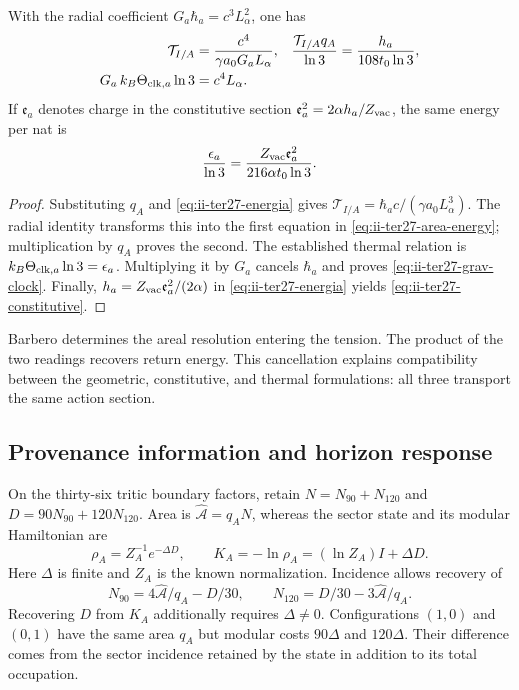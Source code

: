 \begin{proposition}
\label{prop:ii-ter27-area}
With the radial coefficient $G_a\hbar_a=c^3L_\alpha^2$, one has
\begin{align}
 \mathcal T_{I/A}&=\frac{c^4}{\gamma a_0G_aL_\alpha},&
 \frac{\mathcal T_{I/A}q_A}{\ln3}
 &=\frac{h_a}{108t_0\ln3},\label{eq:ii-ter27-area-energy}\\
 G_a\,k_B\Theta_{{\rm clk},a}\ln3&=c^4L_\alpha.&
 \label{eq:ii-ter27-grav-clock}
\end{align}
If $\mathfrak e_a$ denotes charge in the constitutive section
$\mathfrak e_a^2=2\alpha h_a/Z_{\rm vac}$, the same energy per nat is
\begin{equation}
 \frac{\epsilon_a}{\ln3}
 =\frac{Z_{\rm vac}\mathfrak e_a^2}{216\alpha t_0\ln3}.
 \label{eq:ii-ter27-constitutive}
\end{equation}
\end{proposition}
\begin{proof}
Substituting $q_A$ and \eqref{eq:ii-ter27-energia} gives
$\mathcal T_{I/A}=\hbar_ac/(\gamma a_0L_\alpha^3)$.
The radial identity transforms this into the first equation in
\eqref{eq:ii-ter27-area-energy}; multiplication by $q_A$ proves the second.
The established thermal relation is
$k_B\Theta_{{\rm clk},a}\ln3=\epsilon_a$.
Multiplying it by $G_a$ cancels $\hbar_a$ and proves
\eqref{eq:ii-ter27-grav-clock}. Finally,
$h_a=Z_{\rm vac}\mathfrak e_a^2/(2\alpha)$ in
\eqref{eq:ii-ter27-energia} yields \eqref{eq:ii-ter27-constitutive}.
\end{proof}

Barbero determines the areal resolution entering the tension. The product
of the two readings recovers return energy. This cancellation explains
compatibility between the geometric, constitutive, and thermal formulations:
all three transport the same action section.

\subsection{Provenance information and horizon response}
\label{subsec:ii-termica-horizonte}

On the thirty-six tritic boundary factors, retain
$N=N_{90}+N_{120}$ and $D=90N_{90}+120N_{120}$. Area is
$\widehat{\mathcal A}=q_AN$, whereas the sector state and its modular
Hamiltonian are
\begin{equation}
 \rho_A=Z_A^{-1}e^{-\Delta D},\qquad
 K_A=-\ln\rho_A=(\ln Z_A)I+\Delta D.
 \label{eq:ii-ter27-modular}
\end{equation}
Here $\Delta$ is finite and $Z_A$ is the known normalization. Incidence
allows recovery of
\[
 N_{90}=4\widehat{\mathcal A}/q_A-D/30,\qquad
 N_{120}=D/30-3\widehat{\mathcal A}/q_A.
\]
Recovering $D$ from $K_A$ additionally requires $\Delta\ne0$.
Configurations $(1,0)$ and $(0,1)$ have the same area $q_A$ but modular
costs $90\Delta$ and $120\Delta$. Their difference comes from the sector
incidence retained by the state in addition to its total occupation.

